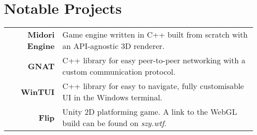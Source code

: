 \section*{Notable Projects}
\begin{center}
    \vspace*{-5mm}
    \begin{tabular}{ r p{} }
      \color{sjBlue}\textbf{Midori Engine} & Game engine written in C++ built from scratch with an API-agnostic 3D renderer. \\
      \color{sjBlue}\textbf{GNAT}          & C++ library for easy peer-to-peer networking with a custom communication protocol. \\
      \color{sjBlue}\textbf{WinTUI}        & C++ library for easy to navigate, fully customisable UI in the Windows terminal. \\
      \color{sjBlue}\textbf{Flip}          & Unity 2D platforming game. A link to the WebGL build can be found on \textit{szy.wtf}.  \\
    \end{tabular}

\end{center}
